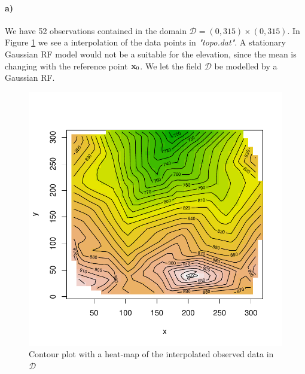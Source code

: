 \paragraph{a)}
We have 52 observations contained in the domain $\mathcal{D} = (0,315)\times(0,315)$. In Figure \ref{fig:terrain2a} we see a interpolation of the data points in \textit{"topo.dat"}. A stationary Gaussian RF model would not be a suitable for the elevation, since the mean is changing with the reference point $\boldsymbol{\mathbf{x}}_0$. We let the field $\mathcal{D}$ be modelled by a Gaussian RF. 

\begin{figure}[htb]
    \centering
    \includegraphics{figures/terrain2a.pdf}
    \caption{Contour plot with a heat-map of the interpolated observed data in $\mathcal{D}$}
    \label{fig:terrain2a}
\end{figure}


